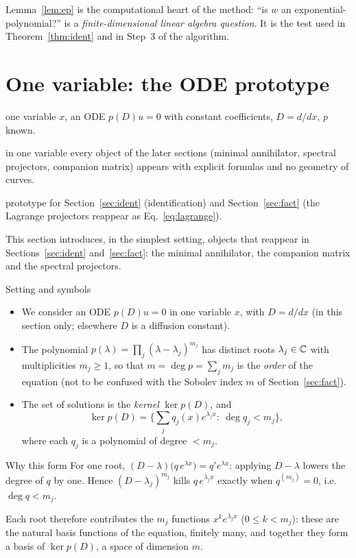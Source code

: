\documentclass[11pt,a4paper]{article}
\theoremstyle{definition}
\newcommand{\sectionbrief}[3]{\begin{leadin}\begin{description}[nosep,leftmargin=3.0cm,labelwidth=2.8cm]
  \item[Starting from] #1
  \item[Why this section] #2
  \item[Role in the paper] #3
  \end{description}\end{leadin}}
\begin{document}
\begin{takeaway}
Lemma~\ref{lem:ep} is the computational heart of the method: ``is $w$ an exponential-polynomial?'' is a \emph{finite-dimensional linear algebra question}. It is the test used in Theorem~\ref{thm:ident} and in Step~3 of the algorithm.
\end{takeaway}



\section{One variable: the ODE prototype}\label{sec:ode}
\sectionbrief
{one variable $x$, an ODE $p(D)u=0$ with constant coefficients, $D=d/dx$, $p$ known.}
{in one variable every object of the later sections (minimal annihilator, spectral projectors, companion matrix) appears with explicit formulas and no geometry of curves.}
{prototype for Section~\ref{sec:ident} (identification) and Section~\ref{sec:fact} (the Lagrange projectors reappear as Eq.~\eqref{eq:lagrange}).}
This section introduces, in the simplest setting, objects that reappear in Sections~\ref{sec:ident} and~\ref{sec:fact}: the minimal annihilator, the companion matrix and the spectral projectors.

\begin{notebox}{Setting and symbols}
\begin{itemize}[nosep]
\item We consider an ODE $p(D)u=0$ in one variable $x$, with $D=d/dx$ (in this section only; elsewhere $D$ is a diffusion constant).
\item The polynomial $p(\lambda)=\prod_j(\lambda-\lambda_j)^{m_j}$ has distinct roots $\lambda_j\in\mathbb{C}$ with multiplicities $m_j\ge1$, so that $m=\deg p=\sum_jm_j$ is the \emph{order} of the equation (not to be confused with the Sobolev index $m$ of Section~\ref{sec:fact}).
\item The set of solutions is the \emph{kernel} $\ker p(D)$, and
\[
\ker p(D)=\Big\{\sum_jq_j(x)e^{\lambda_jx}:\ \deg q_j<m_j\Big\},
\]
where each $q_j$ is a polynomial of degree $<m_j$.
\end{itemize}
\end{notebox}

\begin{aside}{Why this form}
For one root, $(D-\lambda)\big(q\,e^{\lambda x}\big)=q'e^{\lambda x}$: applying $D-\lambda$ lowers the degree of $q$ by one. Hence $(D-\lambda_j)^{m_j}$ kills $q\,e^{\lambda_jx}$ exactly when $q^{(m_j)}=0$, i.e.\ $\deg q<m_j$.

Each root therefore contributes the $m_j$ functions $x^ke^{\lambda_jx}$ ($0\le k<m_j$): these are the natural basis functions of the equation, finitely many, and together they form a basis of $\ker p(D)$, a space of dimension $m$.
\end{aside}
\end{document}
